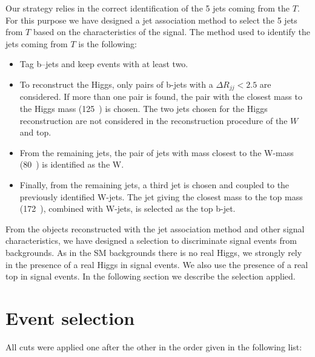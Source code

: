Our strategy relies in the correct identification of the 5 jets coming from the $T$. For this purpose we have designed a jet association method to select the 5 jets from $T$ based on the characteristics of the signal. The method used to identify the jets coming from $T$ is the following:
\begin{itemize}
\item Tag b--jets and keep events with at least two.
\item To reconstruct the Higgs, only pairs of b-jets with a $\Delta R_{jj} <2.5$ are considered. If more than one pair is found, the pair with the closest mass to the Higgs mass (125~\GeVcc) is chosen. The two jets chosen for the Higgs reconstruction are not considered in the reconstruction procedure of the $W$ and top.
\item From the remaining jets, the pair of jets with mass closest to the W-mass (80~\GeVcc) is identified as the W. 
\item Finally, from the remaining jets, a third jet is chosen and coupled to the previously identified W-jets. The jet giving the closest mass to the top mass (172~\GeVcc), combined with W-jets, is selected as the top b-jet.
\end{itemize}

From the objects reconstructed with the jet association method and other signal characteristics, we have designed a selection to discriminate signal events from backgrounds. As in the SM backgrounds there is no real Higgs, we strongly rely in the presence of a real Higgs in signal events. We also use the presence of a real top in signal events. In the following section we describe the selection applied.

\section{Event selection}
\label{sec:Psel}

All cuts were applied one after the other in the order given in the following list:

